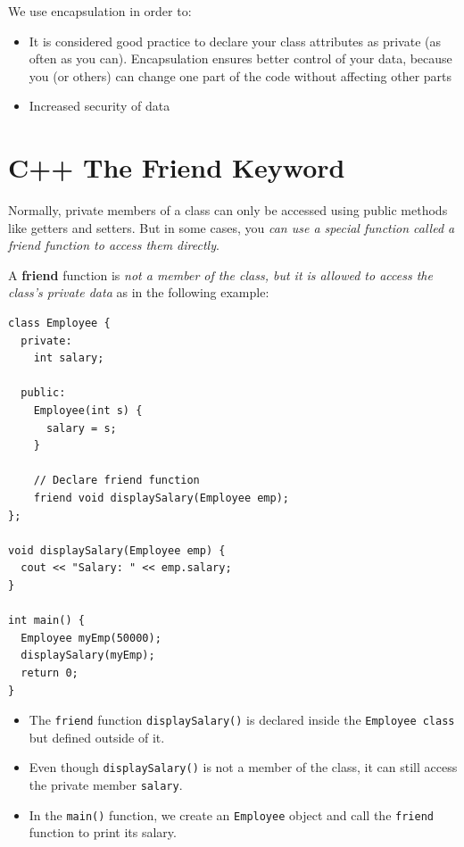 \documentclass[../basic_programs.tex]{subfiles}
\begin{document}
    \begin{obs}
        We use encapsulation in order to:
        \begin{itemize}
            \item It is considered good practice to declare your class attributes as private (as often as you can). Encapsulation ensures better control of your data, because you (or others) can change one part of the code without affecting other parts \item Increased security of data
        \end{itemize}
    \end{obs}

    \section{C++ The Friend Keyword}

    Normally, private members of a class can only be accessed using public methods like getters and setters. But in some cases, you \textit{can use a special function called a friend function to access them directly}.

    A \textbf{friend} function is \textit{not a member of the class, but it is allowed to access the class's private data} as in the following example:

    \begin{lstlisting}[caption={caption},label=DescriptiveLabel]
class Employee {
  private:
    int salary;

  public:
    Employee(int s) {
      salary = s;
    }

    // Declare friend function
    friend void displaySalary(Employee emp);
};

void displaySalary(Employee emp) {
  cout << "Salary: " << emp.salary;
}

int main() {
  Employee myEmp(50000);
  displaySalary(myEmp);
  return 0;
}
    \end{lstlisting}

    \begin{itemize}
        \item The \lstinline|friend| function \lstinline|displaySalary()| is declared inside the \lstinline|Employee class| but defined outside of it.
        \item Even though \lstinline|displaySalary()| is not a member of the class, it can still access the private member \lstinline|salary|.
        \item In the \lstinline|main()| function, we create an \lstinline|Employee| object and call the \lstinline|friend| function to print its salary.
    \end{itemize}
\end{document}
